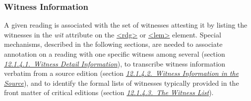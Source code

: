 \subsubsection[{Witness Information}]{Witness Information}\label{TCAPLW}\par
A given reading is associated with the set of witnesses attesting it by listing the witnesses in the {\itshape wit} attribute on the \hyperref[TEI.rdg]{<rdg>} or \hyperref[TEI.lem]{<lem>} element. Special mechanisms, described in the following sections, are needed to associate annotation on a reading with one specific witness among several (section \textit{\hyperref[TCAPWD]{12.1.4.1.\ Witness Detail Information}}), to transcribe witness information verbatim from a source edition (section \textit{\hyperref[TCSCWL]{12.1.4.2.\ Witness Information in the Source}}), and to identify the formal lists of witnesses typically provided in the front matter of critical editions (section \textit{\hyperref[TCAPWL]{12.1.4.3.\ The Witness List}}).
